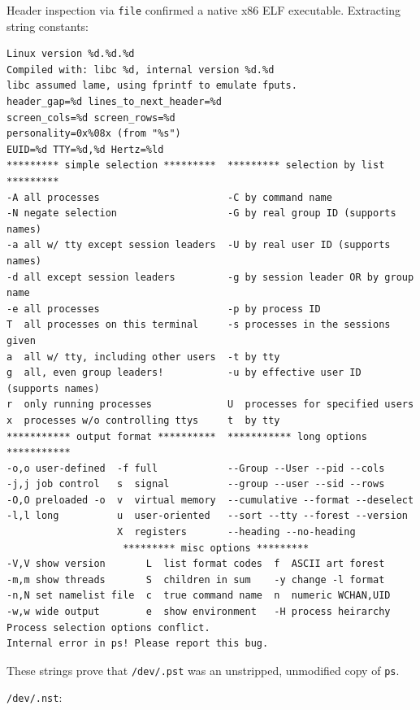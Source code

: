 \vspace{1em}

Header inspection via \texttt{file} confirmed a native x86 ELF executable. Extracting string constants:

\vspace{1em}

\begin{lstlisting}[style=terminal]
Linux version %d.%d.%d
Compiled with: libc %d, internal version %d.%d
libc assumed lame, using fprintf to emulate fputs.
header_gap=%d lines_to_next_header=%d
screen_cols=%d screen_rows=%d
personality=0x%08x (from "%s")
EUID=%d TTY=%d,%d Hertz=%ld
********* simple selection *********  ********* selection by list *********
-A all processes                      -C by command name
-N negate selection                   -G by real group ID (supports names)
-a all w/ tty except session leaders  -U by real user ID (supports names)
-d all except session leaders         -g by session leader OR by group name
-e all processes                      -p by process ID
T  all processes on this terminal     -s processes in the sessions given
a  all w/ tty, including other users  -t by tty
g  all, even group leaders!           -u by effective user ID (supports names)
r  only running processes             U  processes for specified users
x  processes w/o controlling ttys     t  by tty
*********** output format **********  *********** long options ***********
-o,o user-defined  -f full            --Group --User --pid --cols
-j,j job control   s  signal          --group --user --sid --rows
-O,O preloaded -o  v  virtual memory  --cumulative --format --deselect
-l,l long          u  user-oriented   --sort --tty --forest --version
                   X  registers       --heading --no-heading
                    ********* misc options *********
-V,V show version       L  list format codes  f  ASCII art forest
-m,m show threads       S  children in sum    -y change -l format
-n,N set namelist file  c  true command name  n  numeric WCHAN,UID
-w,w wide output        e  show environment   -H process heirarchy
Process selection options conflict.
Internal error in ps! Please report this bug.
\end{lstlisting}

\vspace{1em}

These strings prove that \texttt{/dev/.pst} was an unstripped, unmodified copy of \texttt{ps}.

\texttt{/dev/.nst}:

\vspace{1em}

